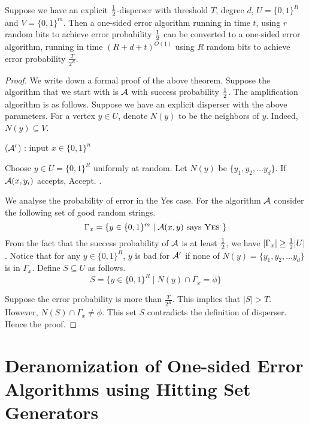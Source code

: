 \begin{theorem}
Suppose we have an explicit $\frac{1}{2}$-disperser with threshold $T$, degree $d$, $U = \{0,1\}^R$ and $V = \{0,1\}^m$. Then a one-sided error algorithm running in time $t$, using $r$ random bits to achieve error probability $\frac{1}{2}$ can be converted to a one-sided error algorithm, running in time $(R+d+t)^{O(1)}$ using $R$ random bits to achieve error probability $\frac{T}{2^R}$.
\end{theorem}
\begin{proof}
We write down a formal proof of the above theorem. Suppose the algorithm that we start with is ${\cal{A}}$ with success probability $\frac{1}{2}$. The amplification algorithm is as follows. Suppose we have an explicit disperser with the above parameters. For a vertex $y \in U$, denote $N(y)$ to be the neighbors of $y$. Indeed, $N(y) \subseteq V$.

\begin{algorithm}
\label{alg:onesided-amplification}
\caption{(${\cal{A}'}$) : input $x \in \{0,1\}^n$} 
\begin{algorithmic}[1]
\State Choose $y \in U=\{0,1\}^R$ uniformly at random. 
\State Let $N(y)$ be $\{y_1, y_2, \ldots y_d\}$.
	\State If ${\cal{A}}(x,y_i)$ accepts, {\sc Accept}.
\EndFor
{}.
\end{algorithmic}
\end{algorithm}

\noindent We analyse the probability of error in the {\sc Yes} case. For the algorithm ${\cal{A}}$ consider the following set of good random strings.
$$\Gamma_x = \{ y \in \{0,1\}^m \mid {\cal{A}}(x,y) \textrm{ says {\sc Yes} }\}$$
From the fact that the success probability of ${\cal{A}}$ is at least $\frac{1}{2}$, we have $|\Gamma_x| \ge \frac{1}{2}|U|$.
Notice that for any $y \in \{0,1\}^R$, $y$ is bad for ${\cal{A}'}$ if none of $N(y) = \{y_1, y_2, \ldots y_d\}$ is in $\Gamma_x$. Define $S \subseteq U$ as follows.
$$S = \{ y \in \{0,1\}^R \mid N(y) \cap \Gamma_x = \phi \}$$

\noindent Suppose the error probability is more than $\frac{T}{2^R}$. This implies that $|S| > T$. However, $N(S) \cap \Gamma_x \ne \phi$. This set $S$ contradicts the definition of disperser. Hence the proof.
\end{proof}

\section{Deranomization of One-sided Error Algorithms using Hitting Set Generators}

